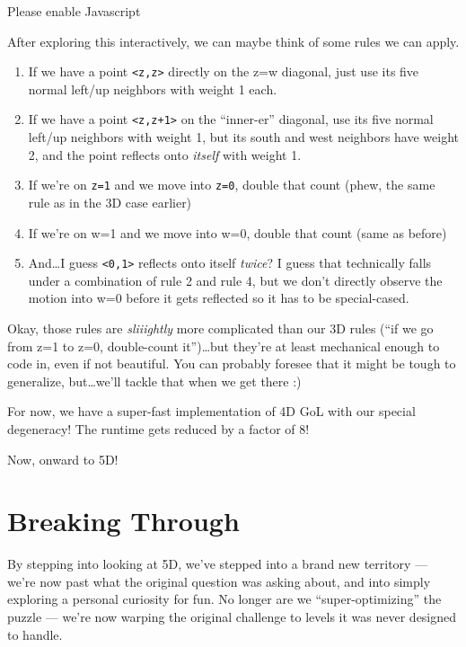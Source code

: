 \documentclass[]{article}
\begin{document}
\leavevmode\hypertarget{golSyms4DReverse}{}%
Please enable Javascript

After exploring this interactively, we can maybe think of some rules we can
apply.

\begin{enumerate}
\def\labelenumi{\arabic{enumi}.}
\tightlist
\item
  If we have a point \texttt{\textless{}z,z\textgreater{}} directly on the z=w
  diagonal, just use its five normal left/up neighbors with weight 1 each.
\item
  If we have a point \texttt{\textless{}z,z+1\textgreater{}} on the ``inner-er''
  diagonal, use its five normal left/up neighbors with weight 1, but its south
  and west neighbors have weight 2, and the point reflects onto \emph{itself}
  with weight 1.
\item
  If we're on \texttt{z=1} and we move into \texttt{z=0}, double that count
  (phew, the same rule as in the 3D case earlier)
\item
  If we're on w=1 and we move into w=0, double that count (same as before)
\item
  And\ldots I guess \texttt{\textless{}0,1\textgreater{}} reflects onto itself
  \emph{twice}? I guess that technically falls under a combination of rule 2 and
  rule 4, but we don't directly observe the motion into w=0 before it gets
  reflected so it has to be special-cased.
\end{enumerate}

Okay, those rules are \emph{sliiightly} more complicated than our 3D rules (``if
we go from z=1 to z=0, double-count it'')\ldots but they're at least mechanical
enough to code in, even if not beautiful. You can probably foresee that it might
be tough to generalize, but\ldots we'll tackle that when we get there :)

For now, we have a super-fast implementation of 4D GoL with our special
degeneracy! The runtime gets reduced by a factor of 8!

Now, onward to 5D!

\hypertarget{breaking-through}{%
\section{Breaking Through}\label{breaking-through}}

By stepping into looking at 5D, we've stepped into a brand new territory ---
we're now past what the original question was asking about, and into simply
exploring a personal curiosity for fun. No longer are we ``super-optimizing''
the puzzle --- we're now warping the original challenge to levels it was never
designed to handle.
\end{document}
